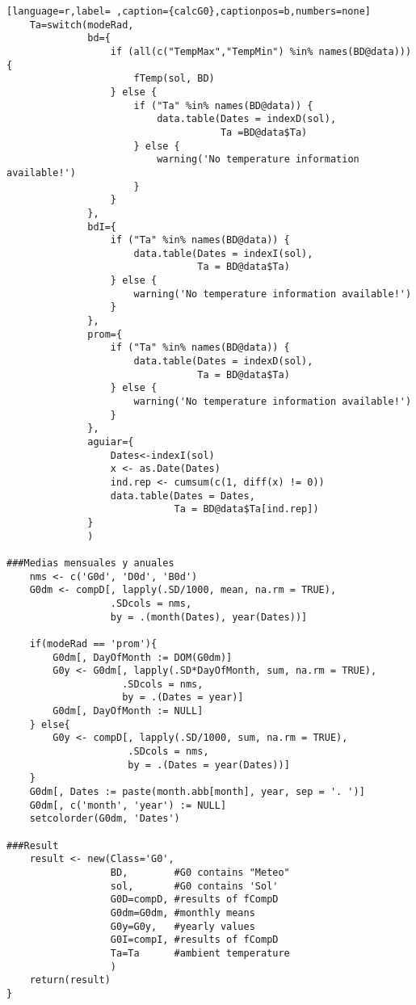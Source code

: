 \begin{lstlisting}[language=r,label= ,caption={calcG0},captionpos=b,numbers=none]
    Ta=switch(modeRad,
              bd={
                  if (all(c("TempMax","TempMin") %in% names(BD@data))) {
                      fTemp(sol, BD)
                  } else {
                      if ("Ta" %in% names(BD@data)) {
                          data.table(Dates = indexD(sol),
                                     Ta =BD@data$Ta)
                      } else {
                          warning('No temperature information available!')
                      }
                  }
              },
              bdI={
                  if ("Ta" %in% names(BD@data)) {
                      data.table(Dates = indexI(sol),
                                 Ta = BD@data$Ta)
                  } else {
                      warning('No temperature information available!')
                  }
              },
              prom={
                  if ("Ta" %in% names(BD@data)) {
                      data.table(Dates = indexD(sol),
                                 Ta = BD@data$Ta)
                  } else {
                      warning('No temperature information available!')
                  }                  
              },
              aguiar={
                  Dates<-indexI(sol)	
                  x <- as.Date(Dates)
                  ind.rep <- cumsum(c(1, diff(x) != 0))
                  data.table(Dates = Dates,
                             Ta = BD@data$Ta[ind.rep])
              }
              )

###Medias mensuales y anuales
    nms <- c('G0d', 'D0d', 'B0d')
    G0dm <- compD[, lapply(.SD/1000, mean, na.rm = TRUE),
                  .SDcols = nms,
                  by = .(month(Dates), year(Dates))]

    if(modeRad == 'prom'){
        G0dm[, DayOfMonth := DOM(G0dm)]
        G0y <- G0dm[, lapply(.SD*DayOfMonth, sum, na.rm = TRUE),
                    .SDcols = nms,
                    by = .(Dates = year)]
        G0dm[, DayOfMonth := NULL]        
    } else{
        G0y <- compD[, lapply(.SD/1000, sum, na.rm = TRUE),
                     .SDcols = nms,
                     by = .(Dates = year(Dates))]
    }
    G0dm[, Dates := paste(month.abb[month], year, sep = '. ')]
    G0dm[, c('month', 'year') := NULL]
    setcolorder(G0dm, 'Dates')

###Result
    result <- new(Class='G0',
                  BD,        #G0 contains "Meteo"
                  sol,       #G0 contains 'Sol'
                  G0D=compD, #results of fCompD
                  G0dm=G0dm, #monthly means
                  G0y=G0y,   #yearly values
                  G0I=compI, #results of fCompD
                  Ta=Ta      #ambient temperature
                  )
    return(result)
}
\end{lstlisting}
